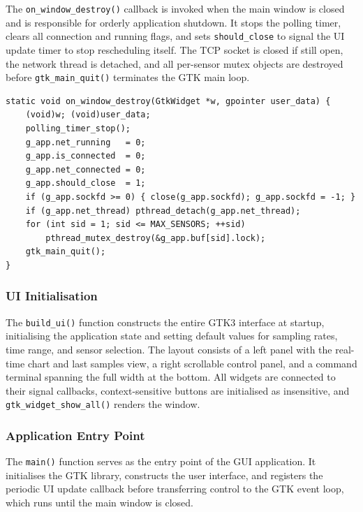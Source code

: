 The \texttt{on\_window\_destroy()} callback is invoked when the main
window is closed and is responsible for orderly application shutdown. It
stops the polling timer, clears all connection and running flags, and
sets \texttt{should\_close} to signal the UI update timer to stop
rescheduling itself. The TCP socket is closed if still open, the network
thread is detached, and all per-sensor mutex objects are destroyed before
\texttt{gtk\_main\_quit()} terminates the GTK main loop.
\begin{verbatim}
static void on_window_destroy(GtkWidget *w, gpointer user_data) {
    (void)w; (void)user_data;
    polling_timer_stop();
    g_app.net_running   = 0;
    g_app.is_connected  = 0;
    g_app.net_connected = 0;
    g_app.should_close  = 1;
    if (g_app.sockfd >= 0) { close(g_app.sockfd); g_app.sockfd = -1; }
    if (g_app.net_thread) pthread_detach(g_app.net_thread);
    for (int sid = 1; sid <= MAX_SENSORS; ++sid)
        pthread_mutex_destroy(&g_app.buf[sid].lock);
    gtk_main_quit();
}
\end{verbatim}

\subsubsection{UI Initialisation}

The \texttt{build\_ui()} function constructs the entire GTK3 interface
at startup, initialising the application state and setting default
values for sampling rates, time range, and sensor selection. The layout
consists of a left panel with the real-time chart and last samples view,
a right scrollable control panel, and a command terminal spanning the
full width at the bottom. All widgets are connected to their signal
callbacks, context-sensitive buttons are initialised as insensitive, and
\texttt{gtk\_widget\_show\_all()} renders the window.



\subsubsection{Application Entry Point}

The \texttt{main()} function serves as the entry point of the GUI
application. It initialises the GTK library, constructs the user
interface, and registers the periodic UI update callback before
transferring control to the GTK event loop, which runs until the main
window is closed.

